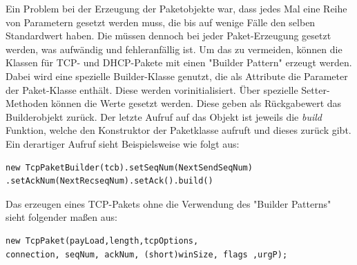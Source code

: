 Ein Problem bei der Erzeugung der Paketobjekte war, dass jedes Mal eine Reihe von Parametern gesetzt werden muss, die bis auf wenige Fälle den selben Standardwert haben. Die müssen dennoch bei jeder Paket-Erzeugung gesetzt werden, was aufwändig und fehleranfällig ist. Um das zu vermeiden, können die Klassen für TCP- und DHCP-Pakete mit einen "{}Builder Pattern"{} erzeugt werden.  Dabei wird eine spezielle Builder-Klasse genutzt, die als Attribute die Parameter der Paket-Klasse enthält. Diese werden vorinitialisiert. Über spezielle Setter-Methoden können die Werte gesetzt werden. Diese geben als Rückgabewert das Builderobjekt zurück. Der letzte Aufruf auf das Objekt ist jeweils die \textit{build} Funktion, welche den Konstruktor der Paketklasse aufruft und dieses zurück gibt. Ein derartiger Aufruf sieht Beispielsweise wie folgt aus: 
\lstset{language=Java}
\begin{lstlisting}
new TcpPaketBuilder(tcb).setSeqNum(NextSendSeqNum)
.setAckNum(NextRecseqNum).setAck().build()
\end{lstlisting}
Das erzeugen eines TCP-Pakets ohne die Verwendung des "{}Builder Patterns"{} sieht folgender maßen aus: 

\begin{lstlisting}
new TcpPaket(payLoad,length,tcpOptions, 
connection, seqNum, ackNum, (short)winSize, flags ,urgP);
\end{lstlisting}



